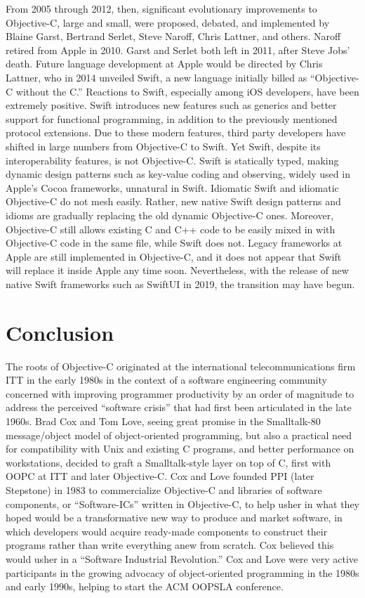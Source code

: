 \documentclass[acmsmall]{acmart}\settopmatter{}
\begin{document}
From 2005 through 2012, then, significant evolutionary improvements to Objective-C, large and small, were proposed, debated, and implemented by Blaine Garst, Bertrand Serlet, Steve Naroff, Chris Lattner, and others. Naroff retired from Apple in 2010. Garst and Serlet both left in 2011, after Steve Jobs' death. Future language development at Apple would be directed by Chris Lattner, who in 2014 unveiled Swift, a new language initially billed as ``Objective-C without the C.'' Reactions to Swift, especially among iOS developers, have been extremely positive. Swift introduces new features such as generics and better support for functional programming, in addition to the previously mentioned protocol extensions. Due to these modern features, third party developers have shifted in large numbers from Objective-C to Swift. Yet Swift, despite its interoperability features, is not Objective-C. Swift is statically typed, making dynamic design patterns such as key-value coding and observing, widely used in Apple's Cocoa frameworks, unnatural in Swift. Idiomatic Swift and idiomatic Objective-C do not mesh easily. Rather, new native Swift design patterns and idioms are gradually replacing the old dynamic Objective-C ones. Moreover, Objective-C still allows existing C and C++ code to be easily mixed in with Objective-C code in the same file, while Swift does not. Legacy frameworks at Apple are still implemented in Objective-C, and it does not appear that Swift will replace it inside Apple any time soon. Nevertheless, with the release of new native Swift frameworks such as SwiftUI in 2019, the transition may have begun.
\section{Conclusion}
\label{sec-conclusion}
The roots of Objective-C originated at the international telecommunications firm ITT in the early 1980s in the context of a software engineering community concerned with improving programmer productivity by an order of magnitude to address the perceived ``software crisis'' that had first been articulated in the late 1960s. Brad Cox and Tom Love, seeing great promise in the Smalltalk-80 message/object model of object-oriented programming, but also a practical need for compatibility with Unix and existing C programs, and better performance on workstations, decided to graft a Smalltalk-style layer on top of C, first with OOPC at ITT and later Objective-C. Cox and Love founded PPI (later Stepstone) in 1983 to commercialize Objective-C and libraries of software components, or ``Software-ICs'' written in Objective-C, to help usher in what they hoped would be a transformative new way to produce and market software, in which developers would acquire ready-made components to construct their programs rather than write everything anew from scratch. Cox believed this would usher in a ``Software Industrial Revolution.'' Cox and Love were very active participants in the growing advocacy of object-oriented programming in the 1980s and early 1990s, helping to start the ACM OOPSLA conference.
\end{document}
